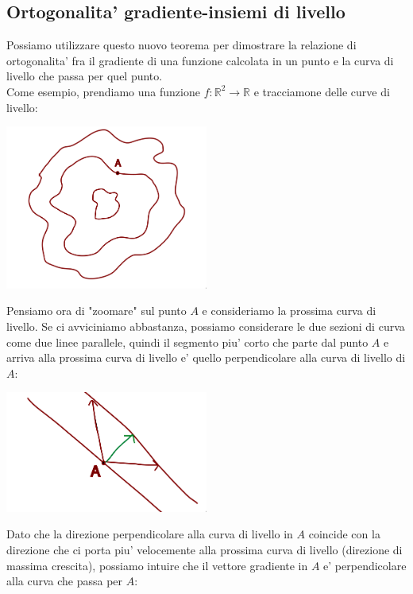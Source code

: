 \documentclass{report}
\begin{document}
\subsection{Ortogonalita' gradiente-insiemi di livello}
Possiamo utilizzare questo nuovo teorema per dimostrare la relazione di ortogonalita' fra il gradiente di una funzione calcolata in un punto e la curva di livello che passa per quel punto.\\
Come esempio, prendiamo una funzione $ f:\mathbb{R}^2\to\mathbb{R} $ e tracciamone delle curve di livello:
\begin{center}
  \includegraphics[width=0.5\textwidth]{img/2024-05-05-19-15-56.png}
\end{center}
Pensiamo ora di "zoomare" sul punto $ A $ e consideriamo la prossima curva di livello. Se ci avviciniamo abbastanza, possiamo considerare le due sezioni di curva come due linee parallele, quindi il segmento piu' corto che parte dal punto $ A $ e arriva alla prossima curva di livello e' quello perpendicolare alla curva di livello di $ A $:
\begin{center}
  \includegraphics[width=0.5\textwidth]{img/2024-05-05-19-33-43.png}
\end{center}
Dato che la direzione perpendicolare alla curva di livello in $ A $ coincide con la direzione che ci porta piu' velocemente alla prossima curva di livello (direzione di massima crescita), possiamo intuire che il vettore gradiente in $ A $ e' perpendicolare alla curva che passa per $ A $:
\end{document}
